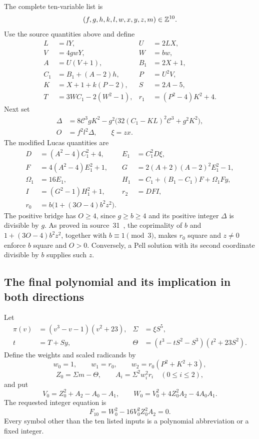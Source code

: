 The complete ten-variable list is
\[
 (f,g,h,k,l,w,x,y,z,m)\in\mathbb Z^{10}.
\]
Use the source quantities above and define
\begin{align*}
 L&=lY,&U&=2LX,\\
 V&=4gwY,&W&=bw,\\
 A&=U(V+1),&B_1&=2X+1,\\
 C_1&=B_1+(A-2)h,&P&=U^2V,\\
 K&=X+1+k(P-2),&S&=2A-5,\\
 T&=3WC_1-2(W^2-1),&r_1&=(P^2-4)K^2+4.
\end{align*}
Next set
\begin{align*}
 \Delta&=8\mathscr C^3gK^2
       -g^2\bigl(32(C_1-KL)^2\mathscr C^3+g^2K^2\bigr),\\
 O&=f^2l^2\Delta,\qquad\xi=zx.
\end{align*}
The modified Lucas quantities are
\begin{align*}
 D&=(A^2-4)C_1^2+4,& E_1&=C_1^2D\xi,\\
 F&=4(A^2-4)E_1^2+1,&G&=2(A+2)(A-2)^2E_1^2-1,\\
 \Omega_1&=16E_1,&H_1&=C_1+(B_1-C_1)F+\Omega_1Fy,\\
 I&=(G^2-1)H_1^2+1,&r_2&=DFI,\\
 r_0&=b\bigl(1+(3O-4)b^2z^2\bigr).&&
\end{align*}
The positive bridge has $O\ge4$, since $g\ge b\ge4$ and its positive
integer $\Delta$ is divisible by $g$.
As proved in source~31~\cite{repo}, the coprimality of $b$ and
$1+(3O-4)b^2z^2$, together with $b\equiv1\pmod3$, makes $r_0$ square
and $z\ne0$ enforce $b$ square and $O>0$. Conversely, a Pell solution
with its second coordinate divisible by $b$ supplies such $z$.

\subsection{The final polynomial and its implication in both directions}

Let
\begin{align*}
 \pi(v)&=(v^3-v-1)(v^2+23),&\Sigma&=\xi S^5,\\
 t&=T+Sy,&
 \Theta&=(t^3-tS^2-S^3)(t^2+23S^2).
\end{align*}
Define the weights and scaled radicands by
\[
 w_0=1,\qquad w_1=r_0,\qquad w_2=r_0(P^2+K^2+3),
\]
\[
 Z_0=\Sigma m-\Theta,\qquad
 A_i=\Sigma^2w_i^2r_i\quad(0\le i\le2),
\]
and put
\[
 V_0=Z_0^2+A_2-A_0-A_1,\qquad
 W_0=V_0^2+4Z_0^2A_2-4A_0A_1.
\]
The requested integer equation is
\[
 \boxed{F_{10}=W_0^2-16V_0^2Z_0^2A_2=0.}
\]
Every symbol other than the ten listed inputs is a polynomial
abbreviation or a fixed integer.

